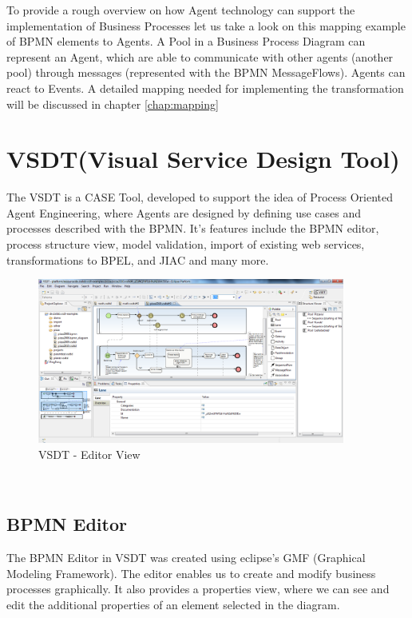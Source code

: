 To provide a rough overview on how Agent technology can support the implementation of Business Processes let us take a look on this mapping example of BPMN elements to Agents. A Pool in a Business Process Diagram can represent an Agent, which are able to communicate with other agents (another pool) through messages (represented with the BPMN MessageFlows). Agents can react to Events. A detailed mapping needed for implementing the transformation will be discussed in chapter \ref{chap:mapping}


\section{VSDT(Visual Service Design Tool)}
\label{sec:vsdt}
The VSDT is a CASE Tool, developed to support the idea of Process Oriented Agent Engineering, where Agents are designed by defining use cases and processes described with the BPMN. It's features include the BPMN editor, process structure view, model validation, import of existing web services, transformations to BPEL, and JIAC and many more. 
\begin{figure}[h]
	\centering
		\includegraphics[width=0.90\textwidth]{images/vsdt_snapshot.png}
	\caption{VSDT - Editor View}
	\label{fig:VSDT}
\end{figure}\\

\subsection{BPMN Editor}
The BPMN Editor in VSDT was created using eclipse's GMF (Graphical Modeling Framework). The editor enables us to create and modify business processes graphically. It also provides a properties view, where we can see and edit the additional properties of an element selected in the diagram. 



